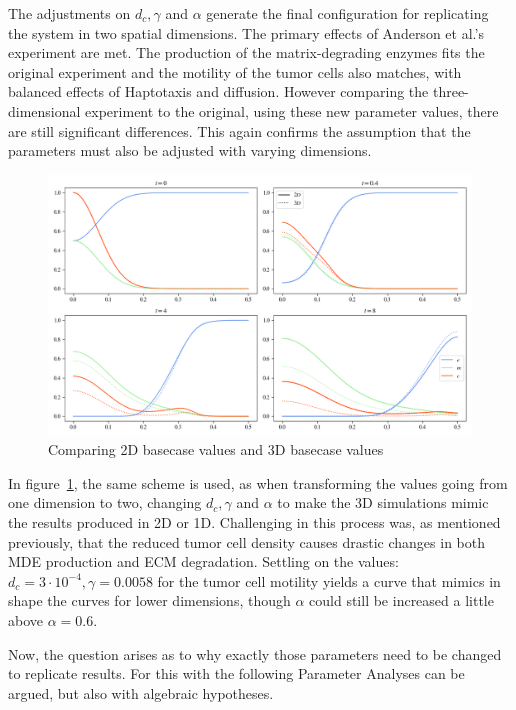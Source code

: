 The adjustments on $d_c,\gamma$ and $\alpha$ generate the final configuration for replicating the system in two spatial dimensions. The primary effects of Anderson et al.'s experiment are met. The production of the matrix-degrading enzymes fits the original experiment and the motility of the tumor cells also matches, with balanced effects of Haptotaxis and diffusion. However comparing the three-dimensional experiment to the original, using these new parameter values, there are still significant differences. This again confirms the assumption that the parameters must also be adjusted with varying dimensions.

\begin{figure}[h!]
    \centering
    \includegraphics[width=\textwidth]{resources/images/basecase_replication.png}
    \caption{Comparing 2D basecase values and 3D basecase values}
    \label{fig:3D_basecase_comparison}
\end{figure}

In figure~\ref{fig:3D_basecase_comparison}, the same scheme is used, as when transforming the values going from one dimension to two, changing $d_c,\gamma$ and $\alpha$ to make the 3D simulations mimic the results produced in 2D or 1D. Challenging in this process was, as mentioned previously, that the reduced tumor cell density causes drastic changes in both MDE production and ECM degradation. Settling on the values: $d_c=3 \cdot 10^{-4}, \gamma=0.0058$ for the tumor cell motility yields a curve that mimics in shape the curves for lower dimensions, though $\alpha$ could still be increased a little above $\alpha=0.6$.

Now, the question arises as to why exactly those parameters need to be changed to replicate results. For this with the following Parameter Analyses can be argued, but also with algebraic hypotheses. 

